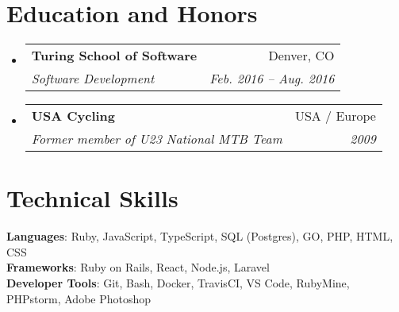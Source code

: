 \documentclass[letterpaper,11pt]{article}
\makeatletter
\newcommand{\resumeSubheading}[4]{
  \vspace{-2pt}\item
    \begin{tabular*}{0.97\textwidth}[t]{l@{\extracolsep{\fill}}r}
      \textbf{#1} & #2 \\
      \textit{\small#3} & \textit{\small #4} \\
    \end{tabular*}\vspace{-7pt}
}
\newcommand{\resumeSubHeadingListStart}{\begin{itemize}[leftmargin=0.15in, label={}]}
\newcommand{\resumeSubHeadingListEnd}{\end{itemize}}
\makeatother
\begin{document}
\section{Education and Honors}
  \resumeSubHeadingListStart
    \resumeSubheading
      {Turing School of Software}{Denver, CO}
      {Software Development}{Feb. 2016 -- Aug. 2016}
    \resumeSubheading
      {USA Cycling}{USA / Europe}
      {Former member of U23 National MTB Team}{2009}
  \resumeSubHeadingListEnd
%
\section{Technical Skills}
 \begin{itemize}[leftmargin=0.15in, label={}]
    \small{\item{
     \textbf{Languages}{: Ruby, JavaScript, TypeScript, SQL (Postgres), GO, PHP, HTML, CSS} \\
     \textbf{Frameworks}{: Ruby on Rails, React, Node.js, Laravel} \\
     \textbf{Developer Tools}{: Git, Bash, Docker, TravisCI, VS Code, RubyMine, PHPstorm, Adobe Photoshop} \\
    }}
 \end{itemize}

\end{document}
